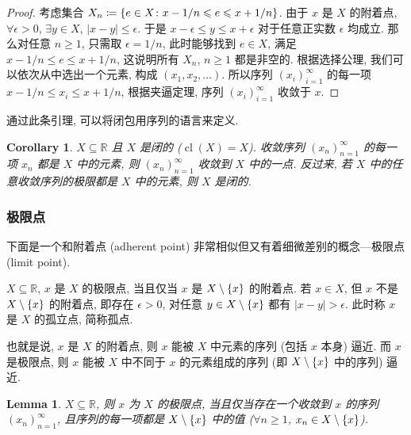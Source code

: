 \documentclass[UTF8]{ctexart}
\theoremstyle{mystyle}
\newtheorem{lemma}{Lemma}[section]
\theoremstyle{myremark}
\theoremstyle{plain}
\newtheorem{corollary}{Corollary}[section]
\newcommand{\R}{\mathbb R}
\DeclarePairedDelimiter\set{\{}{\}}
\DeclareMathOperator{\cl}{cl}
\begin{document}
\begin{proof}
    考虑集合 $ X_n \coloneqq \set{e \in X \colon x - 1/n \leqslant e \leqslant x + 1/n} $. 由于 $ x $ 是 $ X $ 的附着点, $ \forall \epsilon > 0 $, $ \exists y \in X $, $ |x - y| \leqslant \epsilon $. 于是 $ x - \epsilon \leqslant y \leqslant x + \epsilon $ 对于任意正实数 $ \epsilon $ 均成立. 那么对任意 $ n \geqslant 1 $, 只需取 $ \epsilon = 1/n $, 此时能够找到 $ e \in X $, 满足 $ x - 1/n \leqslant e \leqslant x + 1/n $, 这说明所有 $ X_n $, $ n \geqslant 1 $ 都是非空的. 根据选择公理, 我们可以依次从中选出一个元素, 构成 $ (x_1, x_2, \dots) $. 所以序列 $ (x_i)_{i = 1}^\infty $ 的每一项 $ x - 1/n \leqslant x_i \leqslant x + 1/n $, 根据夹逼定理, 序列 $ (x_i)_{i = 1}^\infty $ 收敛于 $ x $.
\end{proof}

通过此条引理, 可以将闭包用序列的语言来定义.

\begin{corollary}
    $ X \subseteq \R $ 且 $ X $ 是闭的 ($ \cl(X) = X $). 收敛序列 $ (x_n)_{n = 1}^\infty $ 的每一项 $ x_n $ 都是 $ X $ 中的元素, 则 $ (x_n)_{n = 1}^\infty $ 收敛到 $ X $ 中的一点. 反过来, 若 $ X $ 中的任意收敛序列的极限都是 $ X $ 中的元素, 则 $ X $ 是闭的.
\end{corollary}

\subsubsection{极限点}
下面是一个和附着点 (adherent point) 非常相似但又有着细微差别的概念---极限点 (limit point).

\begin{definition}
    $ X \subseteq \R $, $ x $ 是 $ X $ 的极限点, 当且仅当 $ x $ 是 $ X \setminus \set{x} $ 的附着点. 若 $ x \in X $, 但 $ x $ 不是 $ X \setminus \set{x} $ 的附着点, 即存在 $ \epsilon > 0 $, 对任意 $ y \in X \setminus \set{x} $ 都有 $ |x - y| > \epsilon $. 此时称 $ x $ 是 $ X $ 的孤立点, 简称孤点.
\end{definition}

也就是说, $ x $ 是 $ X $ 的附着点, 则 $ x $ 能被 $ X $ 中元素的序列 (包括 $ x $ 本身) 逼近. 而 $ x $ 是极限点, 则 $ x $ 能被 $ X $ 中不同于 $ x $ 的元素组成的序列 (即 $ X \setminus \set{x} $ 中的序列) 逼近. 

\begin{lemma}
    $ X \subseteq \R $, 则 $ x $ 为 $ X $ 的极限点, 当且仅当存在一个收敛到 $ x $ 的序列 $ (x_n)_{n = 1}^\infty $, 且序列的每一项都是 $ X \setminus \set{x} $ 中的值 ($ \forall n \geqslant 1 $, $ x_n \in X \setminus \set{x} $).
\end{lemma}
\end{document}
